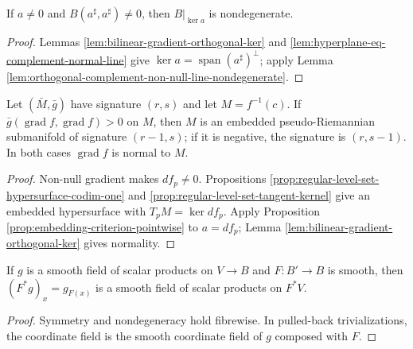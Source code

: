 \begin{lemma}
\label{lem:embedding-criterion-nondegenerate-pointwise}
\leanok
{}
If $a\ne0$ and $B(a^\sharp,a^\sharp)\ne0$, then $B|_{\ker a}$ is nondegenerate.
\end{lemma}
\begin{proof}
\leanok
{}
\sketch Lemmas \ref{lem:bilinear-gradient-orthogonal-ker} and \ref{lem:hyperplane-eq-complement-normal-line} give $\ker a=\operatorname{span}(a^\sharp)^\perp$; apply Lemma \ref{lem:orthogonal-complement-non-null-line-nondegenerate}.
\end{proof}

\begin{corollary}
\label{cor:pseudo-riemannian-embedding-criterion}
\leanok
{}
Let $(\bar M,\bar g)$ have signature $(r,s)$ and let $M=f^{-1}(c)$. If $\bar g(\operatorname{grad}f,\operatorname{grad}f)>0$ on $M$, then $M$ is an embedded pseudo-Riemannian submanifold of signature $(r-1,s)$; if it is negative, the signature is $(r,s-1)$. In both cases $\operatorname{grad}f$ is normal to $M$.
\end{corollary}
\begin{proof}
\leanok
{}
\sketch Non-null gradient makes $df_p\ne0$. Propositions \ref{prop:regular-level-set-hypersurface-codim-one} and \ref{prop:regular-level-set-tangent-kernel} give an embedded hypersurface with $T_pM=\ker df_p$. Apply Proposition \ref{prop:embedding-criterion-pointwise} to $a=df_p$; Lemma \ref{lem:bilinear-gradient-orthogonal-ker} gives normality.
\end{proof}

\begin{lemma}
\label{lem:pullback-pseudo-metric-bundle}
\leanok
{}
If $g$ is a smooth field of scalar products on $V\to B$ and $F:B'\to B$ is smooth, then $(F^*g)_x=g_{F(x)}$ is a smooth field of scalar products on $F^*V$.
\end{lemma}
\begin{proof}
\leanok
{}
\sketch Symmetry and nondegeneracy hold fibrewise. In pulled-back trivializations, the coordinate field is the smooth coordinate field of $g$ composed with $F$.
\end{proof}

